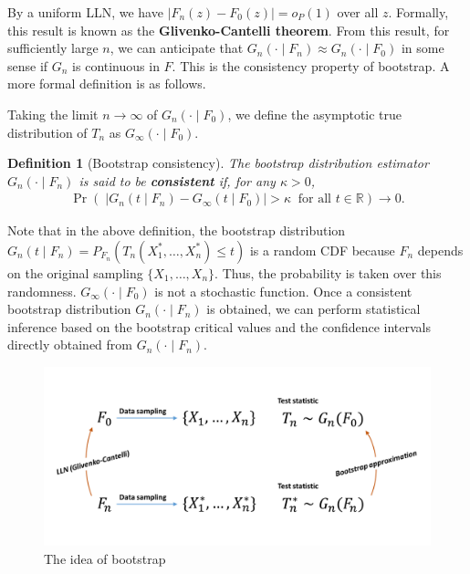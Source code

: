 \documentclass[10.5pt, A4paper, openany, uplatex]{book}
\newtheorem{definition}[theorem]{Definition}
\numberwithin{equation}{section}
\begin{document}
By a uniform LLN, we have $|F_n(z) - F_0(z)| = o_P(1)$ over all $z$.
Formally, this result is known as the \textbf{Glivenko-Cantelli theorem}.
From this result, for sufficiently large $n$, we can anticipate that $G_n(\cdot \mid F_n) \approx G_n(\cdot \mid F_0)$ in some sense if $G_n$ is continuous in $F$.
This is the consistency property of bootstrap.
A more formal definition is as follows.

Taking the limit $n \to \infty$ of $G_n(\cdot \mid F_0)$, we define the asymptotic true distribution of $T_n$ as $G_\infty(\cdot \mid F_0)$.
\begin{definition}[Bootstrap consistency]
	The bootstrap distribution estimator $G_n(\cdot \mid F_n)$ is said to be \textbf{consistent} if, for any $\kappa > 0$,
	\begin{align*}
		\Pr \left(\; |G_n(t \mid F_n) - G_\infty( t \mid F_0)| > \kappa \;\; \text{for all } t \in \mathbb{R} \right) \to 0.
	\end{align*}
\end{definition}
Note that in the above definition, the bootstrap distribution $G_n(t \mid F_n) = P_{F_n}(T_n(X_1^*, \ldots, X_n^*) \le t)$ is a random CDF because $F_n$ depends on the original sampling $\{X_1, \ldots, X_n\}$.
Thus, the probability is taken over this randomness.
$G_\infty(\cdot \mid F_0)$ is not a stochastic function.
Once a consistent bootstrap distribution $G_n(\cdot \mid F_n)$ is obtained, we can perform statistical inference based on the bootstrap critical values and the confidence intervals directly obtained from $G_n(\cdot \mid F_n)$.

\begin{figure}[h!]
	\begin{center}
		\includegraphics[width = 13cm]{bootstrap.png}
		\caption{The idea of bootstrap}
	\end{center}
\end{figure}
\end{document}
